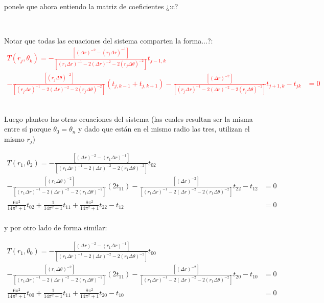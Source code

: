 \documentclass{article}
\begin{document}
\noindent ponele que ahora entiendo la matriz de coeficientes ¿:c?

\

Notar que todas las ecuaciones del sistema comparten la forma...?:
\textcolor{red}{
\begin{align*}
    T(r_j,\theta_k) =-\frac{[{(\Delta r)}^{-2} - {(r_j\Delta r)}^{-1}]}{[{(r_1\Delta r)}^{-1} - 2{(\Delta r)}^{-2} - 2{(r_{j}\Delta \theta)}^{-2}]}t_{j-1,k}
    & \\
    -\frac{[{(r_{j}\Delta \theta)}^{-2}]}{[{(r_j\Delta r)}^{-1} - 2{(\Delta r)}^{-2} - 2{(r_{j}\Delta \theta)}^{-2}]}(t_{j,k-1} + t_{j,k+1})
    -\frac{[{(\Delta r)}^{-2}]}{[{(r_j\Delta r)}^{-1} - 2{(\Delta r)}^{-2} - 2{(r_{j}\Delta \theta)}^{-2}]}t_{j+1,k}  - t_{jk} &= 0
\end{align*}
}
\

\noindent Luego planteo las otras ecuaciones del sistema 
(las cuales resultan ser la misma entre sí porque $\theta_0 = \theta_n$ y 
dado que están en el mismo radio las tres, utilizan el mismo $r_j$)

\begin{align*}
    T(r_1,\theta_2) = -\frac{[{(\Delta r)}^{-2} - {(r_1\Delta r)}^{-1}]}{[{(r_1\Delta r)}^{-1} - 2{(\Delta r)}^{-2} - 2{(r_{1}\Delta \theta)}^{-2}]}t_{02}
    & \\
    -\frac{[{(r_{1}\Delta \theta)}^{-2}]}{[{(r_1\Delta r)}^{-1} - 2{(\Delta r)}^{-2} - 2{(r_{1}\Delta \theta)}^{-2}]}(2t_{11})
    -\frac{[{(\Delta r)}^{-2}]}{[{(r_1\Delta r)}^{-1} - 2{(\Delta r)}^{-2} - 2{(r_{1}\Delta \theta)}^{-2}]}t_{22}  - t_{12} &= 0\\
    \frac{6\pi^2}{14\pi^2 + 1}t_{02}
    +\frac{1}{14\pi^2 + 1}t_{11}
    +\frac{8\pi^2}{14\pi^2 + 1}t_{22} - t_{12} &= 0 \\
\end{align*}

y por otro lado de forma similar:

\begin{align*}
    T(r_1,\theta_0) = -\frac{[{(\Delta r)}^{-2} - {(r_1\Delta r)}^{-1}]}{[{(r_1\Delta r)}^{-1} - 2{(\Delta r)}^{-2} - 2{(r_{1}\Delta \theta)}^{-2}]}t_{00}
    & \\
    -\frac{[{(r_{1}\Delta \theta)}^{-2}]}{[{(r_1\Delta r)}^{-1} - 2{(\Delta r)}^{-2} - 2{(r_{1}\Delta \theta)}^{-2}]}(2t_{11})
    -\frac{[{(\Delta r)}^{-2}]}{[{(r_1\Delta r)}^{-1} - 2{(\Delta r)}^{-2} - 2{(r_{1}\Delta \theta)}^{-2}]}t_{20} - t_{10} &= 0 \\
    \frac{6\pi^2}{14\pi^2 + 1}t_{00}
    +\frac{1}{14\pi^2 + 1}t_{11}
    +\frac{8\pi^2}{14\pi^2 + 1}t_{20} - t_{10} &= 0 \\
\end{align*}
\end{document}
